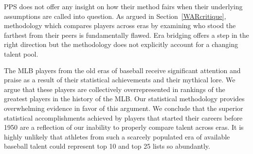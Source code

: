 \documentclass[11pt]{article}\usepackage[]{graphicx}\usepackage[]{color}
\begin{document}
PPS does not offer any insight on how their method fairs when their underlying 
assumptions are called into question.  
As argued in Section~\ref{WARcritique}, methodology which compares players 
across eras by examining who stood the farthest from their peers is 
fundamentally flawed.  Era bridging offers a step in the right direction but 
the methodology does not explicitly account for a changing talent pool.


The MLB players from the old eras of baseball receive significant attention 
and praise as a result of their statistical achievements and their mythical 
lore.  We argue that these players are collectively overrepresented in 
rankings of the greatest players in the history of the MLB.  
Our statistical methodology provides overwhelming evidence in 
favor of this argument. We conclude that the superior statistical 
accomplishments achieved by players that started their careers before 1950 
are a reflection of our inability to properly compare talent across eras.  
It is highly unlikely that athletes from such a scarcely populated era of 
available baseball talent could represent top 10 and top 25 lists so 
abundantly. 


\end{document}
